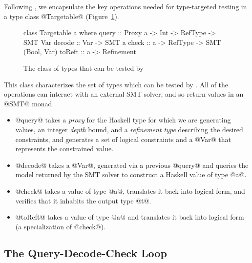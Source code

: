 
Following \quickcheck, we encapsulate the key operations needed
for type-targeted testing in a type class @Targetable@ 
(Figure~\ref{fig:targetable}). 
%
\begin{figure}
\begin{mdframed}
\begin{CenteredBox}
\begin{code}
class Targetable a where
  query  :: Proxy a -> Int -> RefType -> SMT Var
  decode :: Var -> SMT a
  check  :: a -> RefType -> SMT (Bool, Var)
  toReft :: a -> Refinement
\end{code}
\end{CenteredBox}
\end{mdframed}
\caption{The class of types that can be tested by \toolname}\label{fig:targetable}
\end{figure}
%
This class characterizes the set of types which can be tested 
by \toolname. All of the operations can interact with an external SMT 
solver, and so return values in an @SMT@ monad.

\begin{itemize}
\item{@query@} takes a \emph{proxy} for the Haskell type
   for which we are generating values, an integer 
   \emph{depth} bound, and a \emph{refinement type}
   describing the desired constraints, and generates a set of 
   logical constraints and a @Var@ that represents the 
   constrained value.

\item{@decode@} takes a @Var@, generated via a previous 
   @query@ and queries the model returned by the SMT solver
   to construct a Haskell value of type @a@.
 
\item{@check@} takes a value of type @a@, translates 
   it back into logical form, and verifies that it inhabits
   the output type @t@.
   
\item{@toReft@} takes a value of type @a@ and translates it
   back into logical form (a specialization of @check@).
\end{itemize}

\subsection{The Query-Decode-Check Loop}\label{sec:loop}




